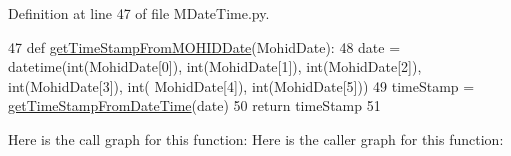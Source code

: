 Definition at line 47 of file M\+Date\+Time.\+py.


\begin{DoxyCode}
47 \textcolor{keyword}{def }\mbox{\hyperlink{namespace_m_date_time_a038322da9ec8ee2770a307c6a63187dd}{getTimeStampFromMOHIDDate}}(MohidDate):
48     date = datetime(int(MohidDate[0]), int(MohidDate[1]), int(MohidDate[2]), int(MohidDate[3]), int(
      MohidDate[4]), int(MohidDate[5]))
49     timeStamp = \mbox{\hyperlink{namespace_m_date_time_a577bd538a3fcb0bbddf8900288324eb5}{getTimeStampFromDateTime}}(date)
50     \textcolor{keywordflow}{return} timeStamp
51 
\end{DoxyCode}
Here is the call graph for this function\+:
Here is the caller graph for this function\+:
